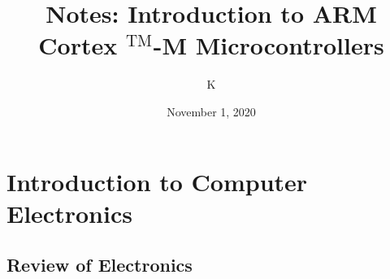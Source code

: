\documentclass[10pt, letterpaper]{article}
\title{Notes: Introduction to ARM Cortex $^{\text{TM}}$-M Microcontrollers}
\author{K}
\date{November 1, 2020}
\begin{document}
\begin{comment}
\begin{titlepage}
    \maketitle
\end{titlepage}
\end{comment}

\maketitle

\tableofcontents{}
\pagebreak

\section{Introduction to Computer Electronics}
\subsection{Review of Electronics}
\end{document}
